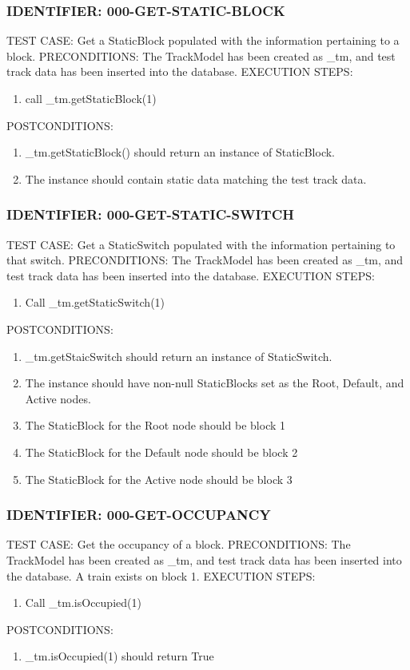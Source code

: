 \documentclass{scrreprt}
\begin{document}
\subsubsection{IDENTIFIER: 000-GET-STATIC-BLOCK}
TEST CASE: Get a StaticBlock populated with the information pertaining to a block.
PRECONDITIONS: The TrackModel has been created as _tm, and test track data has been inserted into the database.
EXECUTION STEPS:
\begin{enumerate}
	\item call _tm.getStaticBlock(1)
\end{enumerate}
POSTCONDITIONS:
\begin{enumerate}
	\item _tm.getStaticBlock() should return an instance of StaticBlock.
	\item The instance should contain static data matching the test track data.
\end{enumerate}

\subsubsection{IDENTIFIER: 000-GET-STATIC-SWITCH}
TEST CASE: Get a StaticSwitch populated with the information pertaining to that switch.
PRECONDITIONS: The TrackModel has been created as _tm, and test track data has been inserted into the database.
EXECUTION STEPS:
\begin{enumerate}
	\item Call _tm.getStaticSwitch(1)
\end{enumerate}
POSTCONDITIONS:
\begin{enumerate}
	\item _tm.getStaicSwitch should return an instance of StaticSwitch.
	\item The instance should have non-null StaticBlocks set as the Root, Default, and Active nodes.
	\item The StaticBlock for the Root node should be block 1
	\item The StaticBlock for the Default node should be block 2
	\item The StaticBlock for the Active node should be block 3
\end{enumerate}

\subsubsection{IDENTIFIER: 000-GET-OCCUPANCY}
TEST CASE: Get the occupancy of a block.
PRECONDITIONS: The TrackModel has been created as _tm, and test track data has been inserted into the database. A train exists on block 1.
EXECUTION STEPS:
\begin{enumerate}
	\item Call _tm.isOccupied(1)
\end{enumerate}
POSTCONDITIONS:
\begin{enumerate}
	\item _tm.isOccupied(1) should return True
\end{enumerate}
\end{document}
